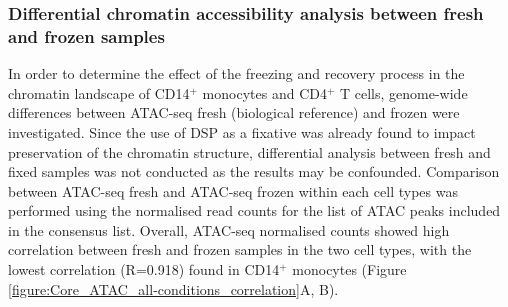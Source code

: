 \subsubsection{Differential chromatin accessibility analysis between fresh and frozen samples}

In order to determine the effect of the freezing and recovery process in the chromatin landscape of CD14$^+$ monocytes and CD4$^+$ T cells, genome-wide differences between ATAC-seq fresh (biological reference) and frozen were investigated. Since the use of DSP as a fixative was already found to impact preservation of the chromatin structure, differential analysis between fresh and fixed samples was not conducted as the results may be confounded. Comparison between ATAC-seq fresh and ATAC-seq frozen within each cell types was performed using the normalised read counts for the list of ATAC peaks included in the consensus list. Overall, ATAC-seq normalised counts showed high correlation between fresh and frozen samples in the two cell types, with the lowest correlation (R=0.918) found in CD14$^+$ monocytes (Figure \ref{figure:Core_ATAC_all-conditions_correlation}A, B).


